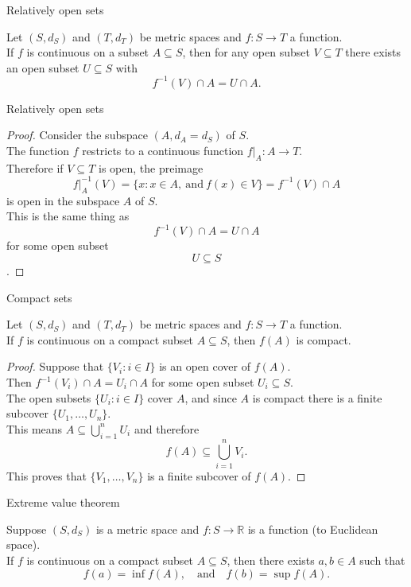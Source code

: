 \documentclass{beamer}
\begin{document}
\begin{frame}{Relatively open sets}
\begin{thm}
Let $(S,d_S)$ and $(T,d_T)$ be metric spaces and $f: S\rightarrow T$ a function.\\
If $f$ is continuous on a subset $A\subseteq S$, then for any open subset $V\subseteq T$ there exists an open subset $U\subseteq S$ with 
$$f^{-1}(V)\cap A = U\cap A.$$
\end{thm}
\end{frame}

\begin{frame}{Relatively open sets}
\begin{proof}
\pause
Consider the subspace $(A,d_A=d_S)$ of $S$.\\
\pause
The function $f$ restricts to a continuous function $f|_A: A\rightarrow T$.\\
\pause
Therefore if $V\subseteq T$ is open, the preimage
$$f|_A^{-1}(V) = \{x: x\in A,\ \text{and}\ f(x)\in V\} = f^{-1}(V)\cap A$$
\pause
is open in the subspace $A$ of $S$.\\
\pause
This is the same thing as
$$ f^{-1}(V)\cap A = U\cap A$$
for some open subset $$U\subseteq S$$.
\end{proof}
\end{frame}

\begin{frame}{Compact sets}
\begin{thm}
Let $(S,d_S)$ and $(T,d_T)$ be metric spaces and $f: S\rightarrow T$ a function.\\
If $f$ is continuous on a compact subset $A\subseteq S$, then $f(A)$ is compact.
\end{thm}
\pause
\begin{proof}
\pause
Suppose that $\{V_i: i\in I\}$ is an open cover of $f(A)$.\\
\pause
Then $f^{-1}(V_i)\cap A = U_i\cap A$ for some open subset $U_i\subseteq S$.\\
\pause
The open subsets $\{U_i: i\in I\}$ cover $A$, and since $A$ is compact there is a finite subcover $\{U_1,\dots,U_n\}$.\\
\pause
This means $A\subseteq \bigcup_{i=1}^n U_i$ and therefore
\pause
$$f(A)\subseteq \bigcup_{i=1}^n V_i.$$
\pause
This proves that $\{V_1,\dots, V_n\}$ is a finite subcover of $f(A)$.
\end{proof}
\end{frame}

\begin{frame}{Extreme value theorem}
\begin{thm}
Suppose $(S,d_S)$ is a metric space and $f: S\rightarrow \mathbb{R}$ is a function (to Euclidean space).\\
If $f$ is continuous on a compact subset $A\subseteq S$, then there exists $a,b\in A$ such that
$$f(a) = \inf f(A),\quad\text{and}\quad f(b) = \sup f(A).$$
\end{thm}
\end{frame}
\end{document}
